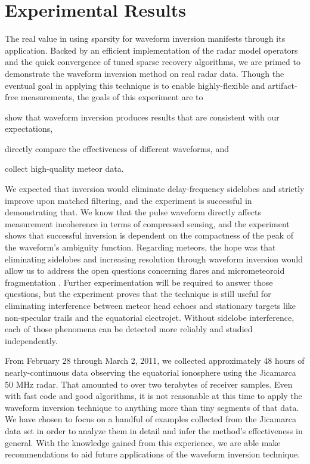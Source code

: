\chapter{Experimental Results}
\label{experimental_results}
The real value in using sparsity for waveform inversion manifests through its application. Backed by an efficient implementation of the radar model operators and the quick convergence of tuned sparse recovery algorithms, we are primed to demonstrate the waveform inversion method on real radar data. Though the eventual goal in applying this technique is to enable highly-flexible and artifact-free measurements, the goals of this experiment are to \begin{inparaenum}[(1)]
 \item show that waveform inversion produces results that are consistent with our expectations,
 \item directly compare the effectiveness of different waveforms, and
 \item collect high-quality meteor data.
\end{inparaenum}

We expected that inversion would eliminate delay-frequency sidelobes and strictly improve upon matched filtering, and the experiment is successful in demonstrating that. We know that the pulse waveform directly affects measurement incoherence in terms of compressed sensing, and the experiment shows that successful inversion is dependent on the compactness of the peak of the waveform's ambiguity function. Regarding meteors, the hope was that eliminating sidelobes and increasing resolution through waveform inversion would allow us to address the open questions concerning flares and micrometeoroid fragmentation \autocite{MBMC10}. Further experimentation will be required to answer those questions, but the experiment proves that the technique is still useful for eliminating interference between meteor head echoes and stationary targets like non-specular trails and the equatorial electrojet. Without sidelobe interference, each of those phenomena can be detected more reliably and studied independently.

From February 28 through March 2, 2011, we collected approximately 48 hours of nearly-continuous data observing the equatorial ionosphere using the Jicamarca 50 MHz radar. That amounted to over two terabytes of receiver samples. Even with fast code and good algorithms, it is not reasonable at this time to apply the waveform inversion technique to anything more than tiny segments of that data. We have chosen to focus on a handful of examples collected from the Jicamarca data set in order to analyze them in detail and infer the method's effectiveness in general. With the knowledge gained from this experience, we are able make recommendations to aid future applications of the waveform inversion technique.

